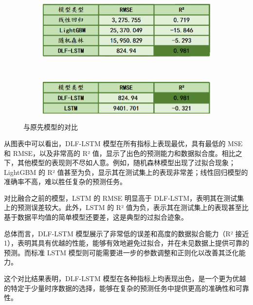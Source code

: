 \begin{figure}[H]
    \centering
    \begin{subfigure}[b]{0.6\linewidth}
        \centering
        \includegraphics[width=\linewidth]{figures/55.png}
     
        \label{fig:enter-label-1}
    \end{subfigure}%
    \\
    \begin{subfigure}[b]{0.6\linewidth}
        \centering
        \includegraphics[width=\linewidth]{figures/56.png}
        
        \label{fig:enter-label-2}
    \end{subfigure}
    \caption{与原先模型的对比}
    \label{fig:combined-label}
\end{figure}

从图表中可以看出，DLF-LSTM 模型在所有指标上表现最优，具有最低的 MSE 和 RMSE，以及非常高的 R² 值，显示了出色的预测能力和数据拟合度。相比之下，其他模型的表现则不尽如人意。例如，随机森林模型出现了过拟合现象；LightGBM 的 R² 值甚至为负，显示其在测试集上的表现非常差；线性回归模型的准确率不高，难以胜任复杂的预测任务。

对比融合之前的模型，LSTM 的 RMSE 明显高于 DLF-LSTM，表明其在测试集上的预测误差较大。此外，LSTM 的 R² 值为负，表示其在测试集上的表现甚至比基于数据平均值的简单模型还要差，这是典型的过拟合迹象。

总体而言，DLF-LSTM 模型展示了非常低的误差和高度的数据拟合能力（R² 接近 1），表明其具有优越的性能，能够有效地避免过拟合，并在未见数据上提供可靠的预测。而标准 LSTM 模型则可能需要进一步的参数调整和正则化以改善其泛化能力。

这个对比结果表明，DLF-LSTM 模型在各种指标上均表现出色，是一个更为优越的特定于少量时序数据的选择，能够在复杂的预测任务中提供更高的准确性和可靠性。
